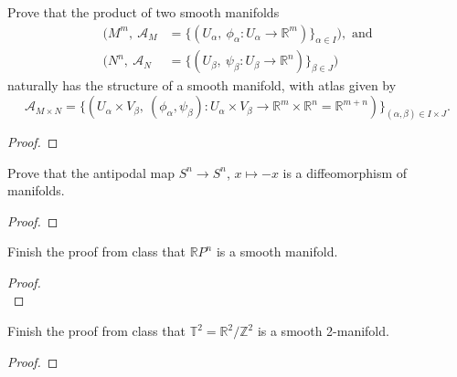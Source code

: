 \documentclass{article}
\newenvironment{problem}[2][Problem]{\begin{trivlist}
\item[\hskip \labelsep {\bfseries #1}\hskip \labelsep {\bfseries #2.}]}{\end{trivlist}}
\begin{document}
\begin{problem}{3}
  Prove that the product of two smooth manifolds \begin{align*}
    (M^m,\ \mathcal{A}_M &= \{(U_\alpha,\ \phi_\alpha: U_\alpha \rightarrow \mathbb{R}^m)\}_{\alpha \in I}), \text{ and}\\
    (N^n,\ \mathcal{A}_N &= \{(U_\beta,\ \psi_\beta: U_\beta \rightarrow \mathbb{R}^n)\}_{\beta \in J})
  \end{align*}
  naturally has the structure of a smooth manifold, with atlas given by \[
    \mathcal{A}_{M\times N} = \{
      (U_\alpha \times V_\beta,\
      (\phi_\alpha, \psi_\beta):
        U_\alpha \times V_\beta \rightarrow
        \mathbb{R}^m \times \mathbb{R}^n = \mathbb{R}^{m + n})
    \}_{(\alpha, \beta) \in I \times J}.
  \]

\end{problem}

\begin{proof}
\end{proof}

\pagebreak

\begin{problem}{4}
  Prove that the antipodal map $S^n \rightarrow S^n$, $x \mapsto -x$ is a
  diffeomorphism of manifolds.
\end{problem}

\begin{proof}
\end{proof}

\pagebreak

\begin{problem}{5}
  Finish the proof from class that $\mathbb{R}P^n$ is a smooth manifold.
\end{problem}

\begin{proof} \text{} \\
\end{proof}

\pagebreak

\begin{problem}{6}
  Finish the proof from class that $\mathbb{T}^2 = \mathbb{R}^2/\mathbb{Z}^2$
  is a smooth 2-manifold.
\end{problem}

\begin{proof} \text{\\}
\end{proof}
\end{document}
